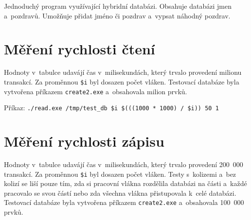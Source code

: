 Jednoduchý program využívající hybridní databázi. Obsahuje databázi
jmen a~pozdravů. Umožňuje přidat jméno či pozdrav a~vypsat náhodný pozdrav.





\section*{Měření rychlosti čtení}
Hodnoty v~tabulce udavájí čas v~milisekundách, který trvalo provedení
milionu transakcí. Za proměnnou \verb|$i| byl dosazen počet vláken.
Testovací databáze byla vytvořena příkazem \verb|create2.exe| a~obsahovala
milion prvků.

\setlength{\parindent}{0cm}
Příkaz: \verb|./read.exe /tmp/test_db $i $(((1000 * 1000) / $i)) 50 1|
\setlength{\parindent}{1cm}

\begin{center}
  
\end{center}

\section*{Měření rychlosti zápisu}
Hodnoty v~tabulce udavájí čas v~milisekundách, který trvalo provedení
200~000 transakcí. Za proměnnou \verb|$i| byl dosazen počet vláken.
Testy s~kolizemi a~bez kolizí se liší pouze tím, zda si pracovní vlákna
rozdělila databázi na části a~každé pracovalo se svou částí nebo zda
všechna vlákna přistupovala k~celé databázi.
Testovací databáze byla vytvořena příkazem \verb|create2.exe| a~obsahovala
100~000 prvků.


